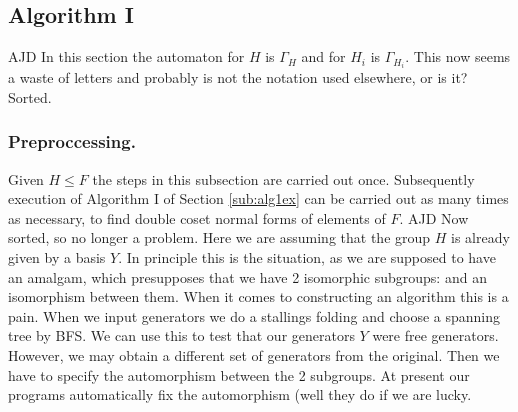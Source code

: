 \documentclass[a4paper,12pt]{article}
\newcommand{\G}{\Gamma }
\numberwithin{equation}{section}
\numberwithin{figure}{section}
\newenvironment{ajd1}{\noindent\color{red} AJD }{}
\newcommand{\ajd}[1]{\begin{ajd1} #1 \end{ajd1}}
\begin{document}
\subsection{Algorithm I}\label{sub:sum_algI}
\ajd{In this section the automaton for $H$ is $\G_H$ and for 
$H_i$ is $\G_{H_i}$. This now seems a waste of letters and probably
is not the notation used elsewhere, or is it? Sorted.}
\subsubsection{Preproccessing.}\label{sub:algIpre}
Given $H\le F$
 the
steps in this subsection are carried out once. Subsequently  execution of Algorithm I of Section \ref{sub:alg1ex} can be carried out as many times as necessary,
to find double coset normal forms of elements of $F$.
\ajd{Now sorted, so no longer a problem. Here we are assuming that the group $H$ is already given by
 a basis $Y$. In principle this is the situation, as we are
supposed to have an amalgam, which presupposes that we have
2 isomorphic subgroups: and an isomorphism between them. When it comes
to constructing an algorithm this is a pain. When we input generators
we do a stallings folding and choose a spanning tree by BFS. We can
use this to test that our generators $Y$ were free generators. However,
we may obtain a different set of generators from the original. Then we
have to specify the automorphism between the 2 subgroups. At present
our programs automatically fix the automorphism (well they do if we
are lucky.}
\end{document}
